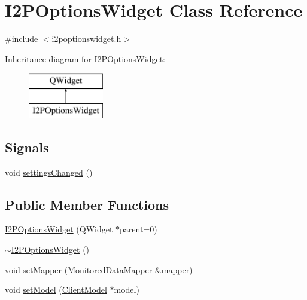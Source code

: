 \hypertarget{class_i2_p_options_widget}{}\section{I2\+P\+Options\+Widget Class Reference}
\label{class_i2_p_options_widget}


{\ttfamily \#include $<$i2poptionswidget.\+h$>$}

Inheritance diagram for I2\+P\+Options\+Widget\+:\begin{figure}[H]
\begin{center}
\leavevmode
\includegraphics[height=2.000000cm]{class_i2_p_options_widget}
\end{center}
\end{figure}
\subsection*{Signals}
\begin{DoxyCompactItemize}
\item 
void \hyperlink{class_i2_p_options_widget_af736252192d753c976d43b01c3c1203b}{settings\+Changed} ()
\end{DoxyCompactItemize}
\subsection*{Public Member Functions}
\begin{DoxyCompactItemize}
\item 
\hyperlink{class_i2_p_options_widget_acc81cb498f44f4b877c0c35bc4a308e5}{I2\+P\+Options\+Widget} (Q\+Widget $\ast$parent=0)
\item 
\hyperlink{class_i2_p_options_widget_aa871b5127452be0087c66998ef0a63ae}{$\sim$\+I2\+P\+Options\+Widget} ()
\item 
void \hyperlink{class_i2_p_options_widget_ae87e45f309b5a3abd782f3b6020eac4f}{set\+Mapper} (\hyperlink{class_monitored_data_mapper}{Monitored\+Data\+Mapper} \&mapper)
\item 
void \hyperlink{class_i2_p_options_widget_af29f341419d72dd0cfb031d2656d4588}{set\+Model} (\hyperlink{class_client_model}{Client\+Model} $\ast$model)
\end{DoxyCompactItemize}


